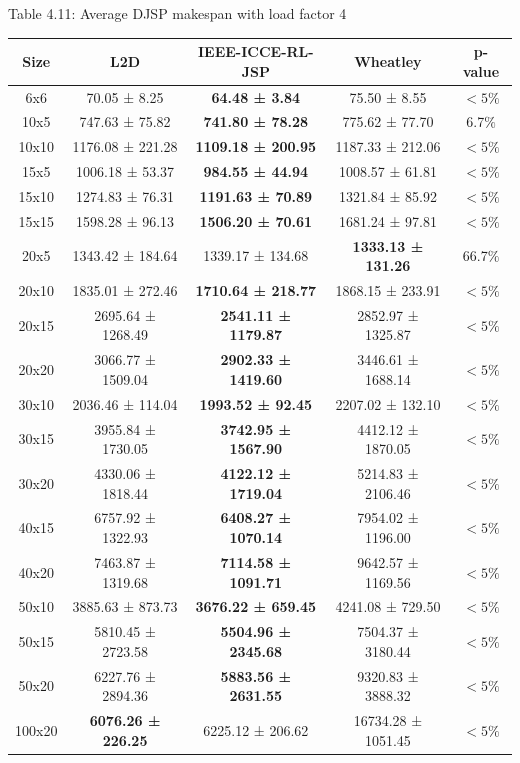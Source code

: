 \begin{table}
    Table 4.11: Average DJSP makespan with load factor 4\\
    \vspace{1mm}
    \label{table:4.8}
    \footnotesize 
    \begin{tabular}{ccccc}
    \toprule
    Size & L2D & IEEE-ICCE-RL-JSP & Wheatley & p-value \\
    \midrule
    6x6 & 70.05 ± 8.25 & \textbf{64.48 ± 3.84} & 75.50 ± 8.55 & $< 5\%$ \\
    10x5 & 747.63 ± 75.82 & \textbf{741.80 ± 78.28} & 775.62 ± 77.70 & 6.7$\%$ \\
    10x10 & 1176.08 ± 221.28 & \textbf{1109.18 ± 200.95} & 1187.33 ± 212.06 & $< 5\%$ \\
    15x5 & 1006.18 ± 53.37 & \textbf{984.55 ± 44.94} & 1008.57 ± 61.81 & $< 5\%$ \\
    15x10 & 1274.83 ± 76.31 & \textbf{1191.63 ± 70.89} & 1321.84 ± 85.92 & $< 5\%$ \\
    15x15 & 1598.28 ± 96.13 & \textbf{1506.20 ± 70.61} & 1681.24 ± 97.81 & $< 5\%$ \\
    20x5 & 1343.42 ± 184.64 & 1339.17 ± 134.68 & \textbf{1333.13 ± 131.26} & 66.7$\%$ \\
    20x10 & 1835.01 ± 272.46 & \textbf{1710.64 ± 218.77} & 1868.15 ± 233.91 & $< 5\%$ \\
    20x15 & 2695.64 ± 1268.49 & \textbf{2541.11 ± 1179.87} & 2852.97 ± 1325.87 & $< 5\%$ \\
    20x20 & 3066.77 ± 1509.04 & \textbf{2902.33 ± 1419.60} & 3446.61 ± 1688.14 & $< 5\%$ \\
    30x10 & 2036.46 ± 114.04 & \textbf{1993.52 ± 92.45} & 2207.02 ± 132.10 & $< 5\%$ \\
    30x15 & 3955.84 ± 1730.05 & \textbf{3742.95 ± 1567.90} & 4412.12 ± 1870.05 & $< 5\%$ \\
    30x20 & 4330.06 ± 1818.44 & \textbf{4122.12 ± 1719.04} & 5214.83 ± 2106.46 & $< 5\%$ \\
    40x15 & 6757.92 ± 1322.93 & \textbf{6408.27 ± 1070.14} & 7954.02 ± 1196.00 & $< 5\%$ \\
    40x20 & 7463.87 ± 1319.68 & \textbf{7114.58 ± 1091.71} & 9642.57 ± 1169.56 & $< 5\%$ \\
    50x10 & 3885.63 ± 873.73 & \textbf{3676.22 ± 659.45} & 4241.08 ± 729.50 & $< 5\%$ \\
    50x15 & 5810.45 ± 2723.58 & \textbf{5504.96 ± 2345.68} & 7504.37 ± 3180.44 & $< 5\%$ \\
    50x20 & 6227.76 ± 2894.36 & \textbf{5883.56 ± 2631.55} & 9320.83 ± 3888.32 & $< 5\%$ \\
    100x20 & \textbf{6076.26 ± 226.25} & 6225.12 ± 206.62 & 16734.28 ± 1051.45 & $< 5\%$ \\
    \bottomrule
    \end{tabular}
\end{table}
    
